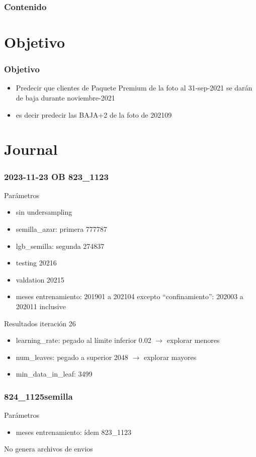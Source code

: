 \documentclass[aspectratio=43]{beamer}
\begin{document}
\begin{frame}
	\frametitle{Contenido}
	\tableofcontents
\end{frame}

\section{Objetivo}

\begin{frame}
	\frametitle{Objetivo}
	\begin{itemize}
		\item Predecir que clientes de Paquete Premium de la foto al 31-sep-2021 se darán de baja durante noviembre-2021
		\item es decir predecir las BAJA+2 de la foto de 202109
	\end{itemize}
\end{frame}

\section{Journal}

\begin{frame}
	\frametitle{2023-11-23 OB 823\_1123}
	Parámetros
	\begin{itemize}
		\item sin undersampling
		\item semilla\_azar: primera 777787
		\item lgb\_semilla: segunda 274837
		\item testing 20216
		\item valdation 20215
		\item meses entrenamiento: 201901 a 202104 excepto ``confinamiento'': 202003 a 202011 inclusive
	\end{itemize}
	Resultados iteración 26
	\begin{itemize}
		\item learning\_rate: pegado al límite inferior 0.02  \(\rightarrow\) explorar menores
		\item num\_leaves: pegado a superior 2048 \(\rightarrow\) explorar mayores
		\item min_data_in_leaf: 3499 
	\end{itemize}
\end{frame}


\begin{frame}
	\frametitle{824\_1125semilla}
	Parámetros
	\begin{itemize}
		\item meses entrenamiento: ídem 823\_1123
	\end{itemize}
	No genera archivos de envios
\end{frame}
\end{document}
